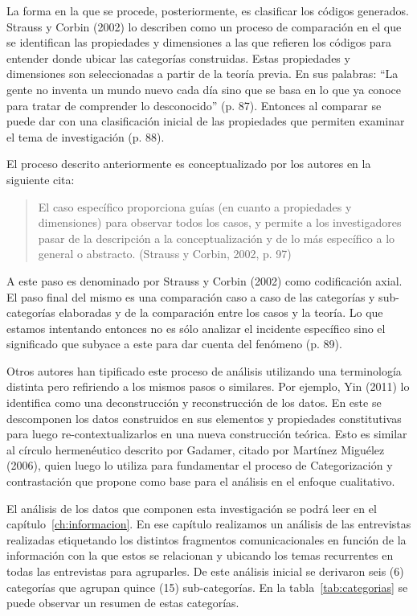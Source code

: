 La forma en la que se procede, posteriormente, es clasificar los códigos
generados. Strauss y Corbin (2002) lo describen como un proceso de
comparación en el que se identifican las propiedades y dimensiones a las que
refieren los códigos para entender donde ubicar las categorías construidas.
Estas propiedades y dimensiones son seleccionadas a partir de la teoría previa.
En sus palabras: “La gente no inventa un mundo nuevo cada día sino que se
basa en lo que ya conoce para tratar de comprender lo desconocido” (p. 87).
Entonces al comparar se puede dar con una clasificación inicial de las
propiedades que permiten examinar el tema de investigación (p. 88).

El proceso descrito anteriormente es conceptualizado por los autores en la
siguiente cita:

\begin{quote}
    El caso específico proporciona guías (en cuanto a propiedades y
    dimensiones) para observar todos los casos, y permite a los
    investigadores pasar de la descripción a la conceptualización y de lo más
    específico a lo general o abstracto. (Strauss y Corbin, 2002, p. 97)
\end{quote}

A este paso es denominado por Strauss y Corbin (2002) como codificación axial.
El paso final del mismo es una comparación caso a caso de las categorías y
sub-categorías elaboradas y de la comparación entre los casos y la teoría.
Lo que estamos intentando entonces no es sólo analizar el incidente
específico sino el significado que subyace a este para dar cuenta del
fenómeno (p. 89).

Otros autores han tipificado este proceso de análisis utilizando una
terminología distinta pero refiriendo a los mismos pasos o similares.
Por ejemplo, Yin (2011) lo identifica como una deconstrucción y
reconstrucción de los datos.
En este se descomponen los datos construidos en sus elementos y propiedades
constitutivas para luego re-contextualizarlos en una nueva construcción teórica.
Esto es similar al círculo hermenéutico descrito por Gadamer, citado por
Martínez Miguélez (2006), quien luego lo utiliza para fundamentar el proceso
de Categorización y contrastación que propone como base para el análisis en
el enfoque cualitativo.

El análisis de los datos que componen esta investigación se podrá leer en el
capítulo~\ref{ch:informacion}.
En ese capítulo realizamos un análisis de las entrevistas realizadas
etiquetando los distintos fragmentos comunicacionales en función de la
información con la que estos se relacionan y ubicando los temas recurrentes
en todas las entrevistas para agruparles.
De este análisis inicial se derivaron seis (6) categorías que agrupan quince
(15) sub-categorías.
En la tabla~\ref{tab:categorias} se puede observar un resumen de estas
categorías.

